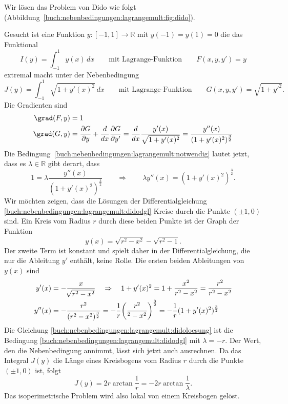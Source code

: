 \begin{beispiel}
Wir lösen das Problem von Dido wie folgt
(Abbildung~\ref{buch:nebenbedingungen:lagrangemult:fig:dido}).

Gesucht ist eine Funktion $y\colon[-1,1]\to\mathbb{R}$ mit $y(-1)=y(1)=0$
die das Funktional
\[
I(y)
=
\int_{-1}^1 y(x)\,dx
\qquad
\text{mit Lagrange-Funktion}
\qquad
F(x,y,y') = y
\]
extremal macht unter der Nebenbedingung 
\[
J(y)
=
\int_{-1}^1 \sqrt{1+y'(x)^2}\,dx
\qquad
\text{mit Lagrange-Funktion}
\qquad
G(x,y,y') = \sqrt{1+y'^2}.
\]
Die Gradienten sind
\begin{align*}
\grad(F,y)
&=
1
\\
\grad(G,y)
&=
\frac{\partial G}{\partial y}
+
\frac{d}{dx}
\frac{\partial G}{\partial y'}
=
\frac{d}{dx}
\frac{y'(x)}{\sqrt{1+y'(x)^2}}
=
\frac{
y''(x)
}{
(1+y'(x)^2)^{\frac32}
}
\end{align*}
Die Bedingung~\eqref{buch:nebenbedingungen:lagrangemult:notwendig} lautet
jetzt, dass es $\lambda\in\mathbb{R}$ gibt derart, dass
\begin{equation}
1 = \lambda\frac{y''(x)}{(1+y'(x)^2)^{\frac32}}
\qquad\Rightarrow\qquad
\lambda y''(x)= (1+y'(x)^2)^{\frac32}.
\label{buch:nebenbedingungen:lagrangemult:didodgl}
\end{equation}
Wir möchten zeigen, dass die Lösungen der Differentialgleichung
\eqref{buch:nebenbedingungen:lagrangemult:didodgl}
Kreise durch die Punkte $(\pm1, 0)$ sind.
Ein Kreis vom Radius $r$ durch diese beiden Punkte ist der Graph
der Funktion
\[
y(x) = \sqrt{r^2-x^2} - \sqrt{r^2-1}.
\]
Der zweite Term ist konstant und spielt daher in der Differentialgleichung,
die nur die Ableitung $y'$ enthält,
keine Rolle.
Die ersten beiden Ableitungen von $y(x)$ sind
\begin{align}
y'(x)
&=
-\frac{x}{\!\sqrt{r^2-x^2}}
\quad\Rightarrow\quad
1+y'(x)^2
=
1+\frac{x^2}{r^2-x^2}
=
\frac{r^2}{r^2-x^2}
\notag
\\
y''(x)
&=
-
\frac{
r^2
}{
(r^2-x^2)^{\frac32}
}
=
-\frac{1}{r}
\biggl(
\frac{r^2}{^2-x^2}
\biggr)^{\frac32}
=
-\frac{1}{r}
(1+y'(x)^2)^{\frac32}
\label{buch:nebenbedingungen:lagrangemult:didoloesung}
\end{align}
Die Gleichung \eqref{buch:nebenbedingungen:lagrangemult:didoloesung}
ist die Bedingung \eqref{buch:nebenbedingungen:lagrangemult:didodgl}
mit $\lambda=-r$.
Der Wert, den die Nebenbedingung annimmt, lässt sich jetzt auch
ausrechnen.
Da das Integral $J(y)$ die Länge eines Kreisbogens vom Radius $r$ 
durch die Punkte $(\pm1,0)$ ist, folgt
\[
J(y)
=
2r\arctan\frac{1}{r}
=
-2r\arctan\frac{1}{\lambda}.
\]
Das isoperimetrische Problem wird also lokal von einem Kreisbogen
gelöst.
\end{beispiel}


